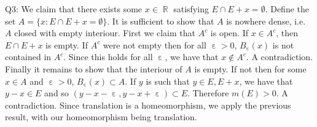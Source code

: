 \documentclass[letterpaper]{article}
\DeclareMathOperator{\R}{\mathbb{R}}
\DeclareMathOperator{\ep}{\varepsilon}
\begin{document}
 \noindent Q3: We claim that there exists some $x\in \R$ satisfying $E \cap E+x = \emptyset.$ 
Define the set $A = \{x: E \cap E+ x = \emptyset \}.$ It is sufficient to show that $A$ is nowhere dense, 
i.e. $A$ closed with empty interiour. First we claim that $A^c$ is open. If $x\in A^c$, then $E\cap E+x  $ is empty. If $A^c$
were not empty then for all $\ep>0$, $B_{\ep}(x)$ is not contained in $A^c$. Since this holds for all $\ep$, we have that $x \not \in A^c$. A contradiction.
Finally it remains to show that the interiour of $A$ is empty. If not then for some $x \in A$ and $\ep >0$, $B_\ep(x) \subset A$. If $y$ is such that $y\in E,E+x$, we have that $y-x\in E$ and so $(y-x-\ep,y-x+\ep) \subset E$. Therefore $m(E)>0$. A contradiction. 
Since translation is a homeomorphism, we apply the previous result, with our homeomorphism being translation. 
\end{document}
